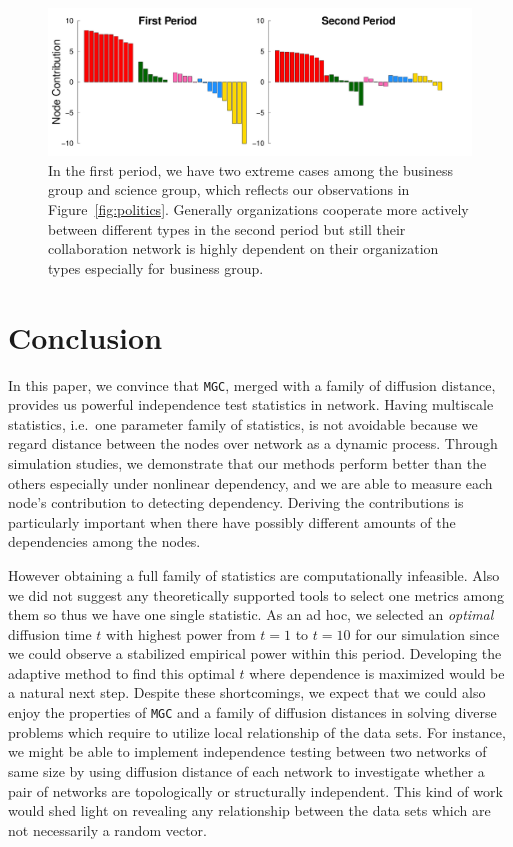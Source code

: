 \documentclass[11pt]{article}
\theoremstyle{definition}
\begin{document}
\begin{figure}[ht]
	\centering
	\includegraphics[width=\linewidth]{../Figure/barplots_nolegend.pdf}	
	\caption{In the first period, we have two extreme cases among the business group and science group, which reflects our observations in Figure~\ref{fig:politics}. Generally organizations cooperate more actively between different types in the second period but still their collaboration network is highly dependent on their organization types especially for business group.}
	\label{fig:barplots}
\end{figure}


\vspace*{-0.5cm}
\section{Conclusion}
\label{sec:conc}
	\vspace*{-0.2cm}
In this paper, we convince that \texttt{MGC}, merged with a family of diffusion distance, provides us powerful independence test statistics in network. Having multiscale statistics, i.e.~one parameter family of statistics, is not avoidable because we regard distance between the nodes over network as a dynamic process. Through simulation studies, we demonstrate that our methods perform better than the others especially under nonlinear dependency, and we are able to measure each node's contribution to detecting dependency. Deriving the contributions is particularly important when there have possibly different amounts of the dependencies among the nodes.  

However obtaining a full family of statistics are computationally infeasible. Also we did not suggest any theoretically supported tools to select one metrics among them so thus we have one single statistic. As an ad hoc, we selected an \textit{optimal} diffusion time $t$ with highest power from $t=1$ to $t=10$ for our simulation since we could observe a stabilized empirical power within this period. Developing the adaptive method to find this optimal $t$ where dependence is maximized would be a natural next step. Despite these shortcomings, we expect that we could also enjoy the properties of \texttt{MGC} and a family of diffusion distances in solving diverse problems which require to utilize local relationship of the data sets. For instance, we might be able to implement independence testing between two networks of same size by using diffusion distance of each network to investigate whether a pair of networks are topologically or structurally independent. This kind of work would shed light on revealing any relationship between the data sets which are not necessarily a random vector.
\end{document}
